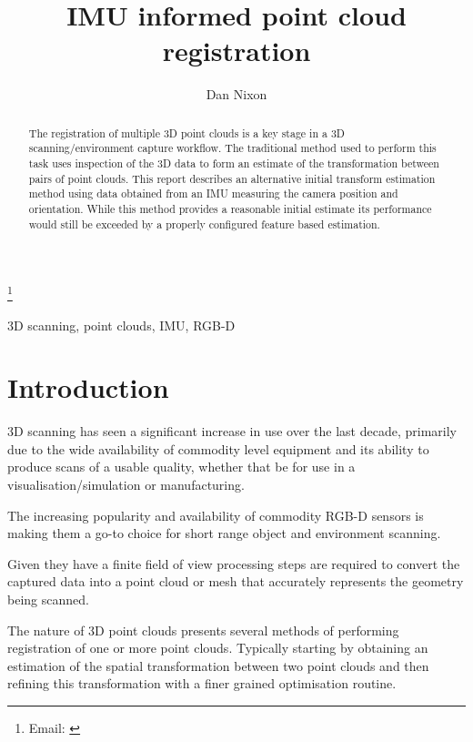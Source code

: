 \documentclass{entcs}
\begin{document}
\begin{frontmatter}
  \title{IMU informed point cloud registration}
  \author{Dan Nixon}
  \address{School of Computing Science, Newcastle University, UK}
  \thanks[email]{Email:
    \href{mailto:d.nixon2@ncl.ac.uk}
  {\texttt{}}}

  \begin{abstract}
    The registration of multiple 3D point clouds is a key stage in a 3D
    scanning/environment capture workflow. The traditional method used to
    perform this task uses inspection of the 3D data to form an estimate of the
    transformation between pairs of point clouds. This report describes an
    alternative initial transform estimation method using data obtained from an
    IMU measuring the camera position and orientation. While this method
    provides a reasonable initial estimate its performance would still be
    exceeded by a properly configured feature based estimation.
  \end{abstract}

  \begin{keyword}
    3D scanning, point clouds, IMU, RGB-D
  \end{keyword}
\end{frontmatter}

\section{Introduction}

3D scanning has seen a significant increase in use over the last decade,
primarily due to the wide availability of commodity level equipment and its
ability to produce scans of a usable quality, whether that be for use in a
visualisation/simulation or manufacturing.

The increasing popularity and availability of commodity RGB-D sensors is making
them a go-to choice for short range object and environment scanning.

Given they have a finite field of view processing steps are required to convert
the captured data into a point cloud or mesh that accurately represents the
geometry being scanned.

The nature of 3D point clouds presents several methods of performing
registration of one or more point clouds. Typically starting by obtaining an
estimation of the spatial transformation between two point clouds and then
refining this transformation with a finer grained optimisation routine.
\end{document}
